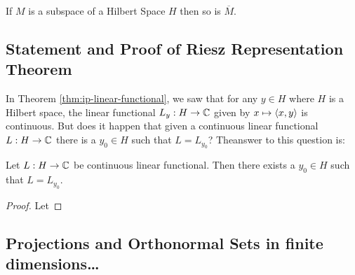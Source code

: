 \begin{exercise}
    If $M$ is a subspace of a Hilbert Space $H$ then so is $\overline M$.
\end{exercise}
\subsection{Statement and Proof of Riesz Representation Theorem}
In Theorem \ref{thm:ip-linear-functional}, we saw that for any $y \in H$ where $H$ is a Hilbert space, the linear functional $L_{y} : H \to \mathbb C$ given by $x \mapsto \left\langle x,y \right\rangle$ is continuous. But does it happen that given a continuous linear functional $L : H \to \mathbb C$ there is a $y_{0} \in H$ such that $L = L_{y_{0}}$? Theanswer to this question is:

\begin{theorem}
    Let $L : H \to \mathbb C$ be continuous linear functional. Then there exists a $y_{0} \in H$ such that $L=L_{y_{0}}$.
    \label{thm:riesz-rep-thm-for-hilbert}
\end{theorem}
\begin{proof}
    Let
\end{proof}

\subsection{Projections and Orthonormal Sets in finite dimensions\ldots}
